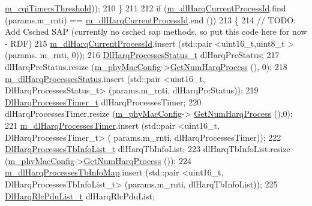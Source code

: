 \begin{DoxyCode}
      \hyperlink{classns3_1_1MmWaveRrMacScheduler_a21360d09f2e5e4b9fc304752aef8ae6a}{m\_cqiTimersThreshold}));
210   \}
211 
212   \textcolor{keywordflow}{if} (\hyperlink{classns3_1_1MmWaveRrMacScheduler_a6ff50e3af4095ffc47155de7d30c8d6d}{m\_dlHarqCurrentProcessId}.find (params.m\_rnti) == 
      \hyperlink{classns3_1_1MmWaveRrMacScheduler_a6ff50e3af4095ffc47155de7d30c8d6d}{m\_dlHarqCurrentProcessId}.end ())
213   \{
214         \textcolor{comment}{// TODO: Add Csched SAP (currently no csched sap methods, so put this code here for now - RDF)}
215         \hyperlink{classns3_1_1MmWaveRrMacScheduler_a6ff50e3af4095ffc47155de7d30c8d6d}{m\_dlHarqCurrentProcessId}.insert (std::pair <uint16\_t,uint8\_t > (params.
      m\_rnti, 0));
216         \hyperlink{classns3_1_1MmWaveRrMacScheduler_a4edf77bbe56479bae12f56826a43b134}{DlHarqProcessesStatus\_t} dlHarqPrcStatus;
217         dlHarqPrcStatus.resize (\hyperlink{classns3_1_1MmWaveMacScheduler_a24d7af4971d2e500fe543cefbafa2fd9}{m\_phyMacConfig}->\hyperlink{classns3_1_1MmWavePhyMacCommon_a40773d84172ebeb5aff125f56ebcc5ac}{GetNumHarqProcess} (), 0);
218         \hyperlink{classns3_1_1MmWaveRrMacScheduler_a5734289010d38bd8dfe04ed50ba99936}{m\_dlHarqProcessesStatus}.insert (std::pair <uint16\_t,
       DlHarqProcessesStatus\_t> (params.m\_rnti, dlHarqPrcStatus));
219         \hyperlink{classns3_1_1MmWaveRrMacScheduler_a750009728f27d7ea202009e12cf7f6de}{DlHarqProcessesTimer\_t} dlHarqProcessesTimer;
220         dlHarqProcessesTimer.resize (\hyperlink{classns3_1_1MmWaveMacScheduler_a24d7af4971d2e500fe543cefbafa2fd9}{m\_phyMacConfig}->
      \hyperlink{classns3_1_1MmWavePhyMacCommon_a40773d84172ebeb5aff125f56ebcc5ac}{GetNumHarqProcess} (),0);
221         \hyperlink{classns3_1_1MmWaveRrMacScheduler_aa52dc4680386f8ccf85d6b9c685463d1}{m\_dlHarqProcessesTimer}.insert (std::pair <uint16\_t, DlHarqProcessesTimer\_t> (
      params.m\_rnti, dlHarqProcessesTimer));
222         \hyperlink{classns3_1_1MmWaveRrMacScheduler_a0ca6ed6e2801f50786257fc6ef19a907}{DlHarqProcessesTbInfoList\_t} dlHarqTbInfoList;
223         dlHarqTbInfoList.resize (\hyperlink{classns3_1_1MmWaveMacScheduler_a24d7af4971d2e500fe543cefbafa2fd9}{m\_phyMacConfig}->\hyperlink{classns3_1_1MmWavePhyMacCommon_a40773d84172ebeb5aff125f56ebcc5ac}{GetNumHarqProcess} ());
224         \hyperlink{classns3_1_1MmWaveRrMacScheduler_a8d14c222701c0a57ecbd40a51d0391da}{m\_dlHarqProcessesTbInfoMap}.insert (std::pair <uint16\_t,
       DlHarqProcessesTbInfoList\_t> (params.m\_rnti, dlHarqTbInfoList));
225         \hyperlink{classns3_1_1MmWaveRrMacScheduler_a1cd0bc1339970dc27da4f599233b911c}{DlHarqRlcPduList\_t} dlHarqRlcPduList;

\end{DoxyCode}
